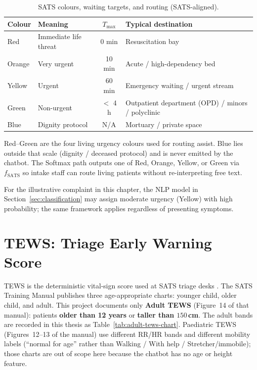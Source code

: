 \begin{table}[H]
\centering
\small
\begin{tabular}{|l|l|c|p{4.2cm}|}
\hline
\textbf{Colour} & \textbf{Meaning} & \(T_{\max}\) & \textbf{Typical destination} \\
\hline
Red & Immediate life threat & 0 min & Resuscitation bay \\
Orange & Very urgent & 10 min & Acute / high-dependency bed \\
Yellow & Urgent & 60 min & Emergency waiting / urgent stream \\
Green & Non-urgent & \(<\) 4 h & Outpatient department (OPD) / minors / polyclinic \\
Blue & Dignity protocol & N/A & Mortuary / private space \\
\hline
\end{tabular}
\caption{SATS colours, waiting targets, and routing (SATS-aligned).}
\label{tab:sats-routing}
\end{table}

\begin{remark}
Red--Green are the four living urgency colours used for routing assist. Blue lies outside that scale (dignity / deceased protocol) and is never emitted by the chatbot. The Softmax path outputs one of Red, Orange, Yellow, or Green via \(f_{\mathrm{SATS}}\) so intake staff can route living patients without re-interpreting free text.
\end{remark}

For the illustrative complaint in this chapter, the NLP model in Section~\ref{sec:classification} may assign moderate urgency (Yellow) with high probability; the same framework applies regardless of presenting symptoms.

\section{TEWS: Triage Early Warning Score}
\label{sec:tews}

TEWS is the deterministic vital-sign score used at SATS triage desks \citep{satsmanual}. The SATS Training Manual publishes three age-appropriate charts: younger child, older child, and adult. This project documents only \textbf{Adult TEWS} (Figure~14 of that manual): patients \textbf{older than 12 years} or \textbf{taller than \(150\)\,cm}. The adult bands are recorded in this thesis as Table~\ref{tab:adult-tews-chart}. Paediatric TEWS (Figures~12--13 of the manual) use different RR/HR bands and different mobility labels (``normal for age'' rather than Walking / With help / Stretcher/immobile); those charts are out of scope here because the chatbot has no age or height feature.

